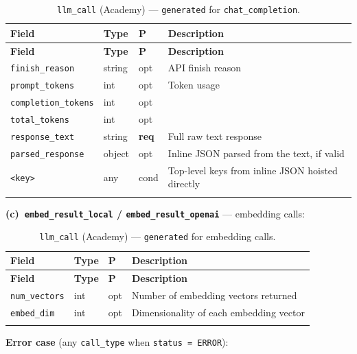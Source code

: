 \documentclass[11pt,a4paper]{article}
\newcommand{\opt}{\textcolor{optred}{opt}}
\newcommand{\cond}{\textcolor{condorange}{cond}}
\newcommand{\req}{\textbf{req}}
\newcommand{\subtype}[1]{\texttt{\textcolor{subtypeblue}{#1}}}
\begin{document}
\begin{longtable}{L{4cm} L{2.5cm} C{1.2cm} L{6.5cm}}
\toprule
\textbf{Field} & \textbf{Type} & \textbf{P} & \textbf{Description} \\
\midrule
\endfirsthead
\toprule \textbf{Field} & \textbf{Type} & \textbf{P} & \textbf{Description} \\
\midrule
\endhead
\bottomrule
\endlastfoot

\texttt{finish\_reason}     & string & \opt & API finish reason \\
\texttt{prompt\_tokens}     & int    & \opt & Token usage \\
\texttt{completion\_tokens} & int    & \opt & \\
\texttt{total\_tokens}      & int    & \opt & \\
\texttt{response\_text}     & string & \req & Full raw text response \\
\texttt{parsed\_response}   & object & \opt & Inline JSON parsed from the text, if valid \\
\texttt{<key>}              & any    & \cond
  & Top-level keys from inline JSON hoisted directly \\

\caption{\subtype{llm\_call} (Academy) — \texttt{generated} for \texttt{chat\_completion}.}
\end{longtable}

\noindent\textbf{(c)~\texttt{embed\_result\_local} / \texttt{embed\_result\_openai}} — embedding calls:

\begin{longtable}{L{4cm} L{2.5cm} C{1.2cm} L{6.5cm}}
\toprule
\textbf{Field} & \textbf{Type} & \textbf{P} & \textbf{Description} \\
\midrule
\endfirsthead
\toprule \textbf{Field} & \textbf{Type} & \textbf{P} & \textbf{Description} \\
\midrule
\endhead
\bottomrule
\endlastfoot

\texttt{num\_vectors} & int & \opt & Number of embedding vectors returned \\
\texttt{embed\_dim}   & int & \opt & Dimensionality of each embedding vector \\

\caption{\subtype{llm\_call} (Academy) — \texttt{generated} for embedding calls.}
\end{longtable}

\noindent\textbf{Error case} (any \texttt{call\_type} when \texttt{status = ERROR}):
\end{document}
